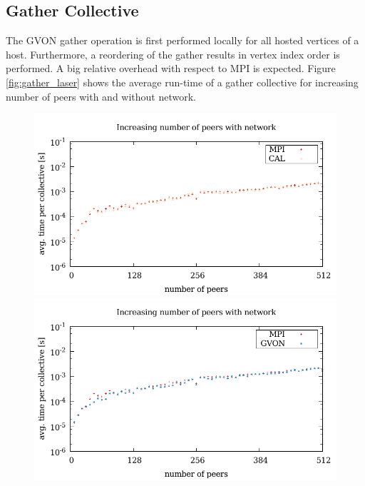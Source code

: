 
\subsection*{Gather Collective}
The GVON gather operation is first performed locally for all hosted
vertices of a host. Furthermore, a reordering of the gather results in
vertex index order is performed. A big relative overhead with respect
to MPI is expected.  Figure \ref{fig:gather_laser} shows the average
run-time of a gather collective for increasing number of peers with
and without network.

\begin{figure}[H]
  \begin{minipage}[t]{0.5\textwidth}
    \includegraphics[width=\textwidth]{plots/50_collective_network_cal_laser}
    \includegraphics[width=\textwidth]{plots/50_collective_network_gvon_laser}

\end{minipage}
\end{figure}
